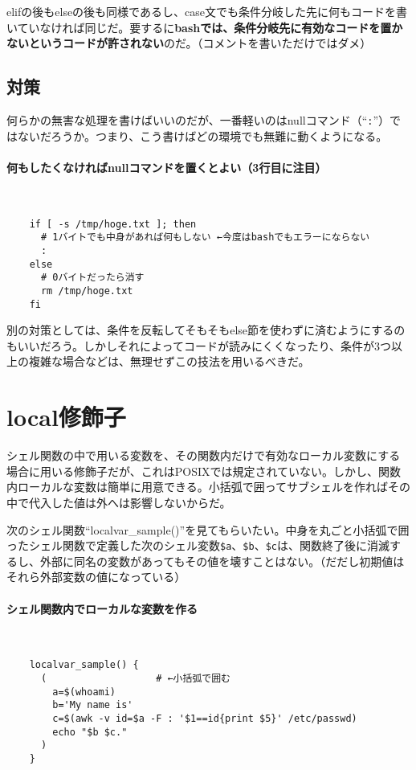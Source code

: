 elifの後もelseの後も同様であるし、case文でも条件分岐した先に何もコードを書いていなければ同じだ。要するに\textbf{bashでは、条件分岐先に有効なコードを置かないというコードが許されない}のだ。（コメントを書いただけではダメ）

\subsection*{対策}

何らかの無害な処理を書けばいいのだが、一番軽いのはnullコマンド（``\verb|:|''）ではないだろうか。つまり、こう書けばどの環境でも無難に動くようになる。

\paragraph{何もしたくなければnullコマンドを置くとよい（3行目に注目）} 　\\
\begin{frameboxit}{160.0mm}
\begin{verbatim}
	if [ -s /tmp/hoge.txt ]; then
	  # 1バイトでも中身があれば何もしない ←今度はbashでもエラーにならない
	  :
	else
	  # 0バイトだったら消す
	  rm /tmp/hoge.txt
	fi
\end{verbatim}
\end{frameboxit}

別の対策としては、条件を反転してそもそもelse節を使わずに済むようにするのもいいだろう。しかしそれによってコードが読みにくくなったり、条件が3つ以上の複雑な場合などは、無理せずこの技法を用いるべきだ。

\section{local修飾子}
\label{allenvs:local_keyword}

シェル関数の中で用いる変数を、その関数内だけで有効なローカル変数にする場合に用いる修飾子だが、これはPOSIXでは規定されていない。しかし、関数内ローカルな変数は簡単に用意できる。小括弧で囲ってサブシェルを作ればその中で代入した値は外へは影響しないからだ。

次のシェル関数``localvar\_{}sample()''を見てもらいたい。中身を丸ごと小括弧で囲ったシェル関数で定義した次のシェル変数\verb|$a|、\verb|$b|、\verb|$c|は、関数終了後に消滅するし、外部に同名の変数があってもその値を壊すことはない。（だだし初期値はそれら外部変数の値になっている）

\paragraph{シェル関数内でローカルな変数を作る} 　\\
\begin{frameboxit}{160.0mm}
\begin{verbatim}
	localvar_sample() {
	  (                   # ←小括弧で囲む
	    a=$(whoami)
	    b='My name is'
	    c=$(awk -v id=$a -F : '$1==id{print $5}' /etc/passwd)
	    echo "$b $c."
	  )
	}
\end{verbatim}
\end{frameboxit}

